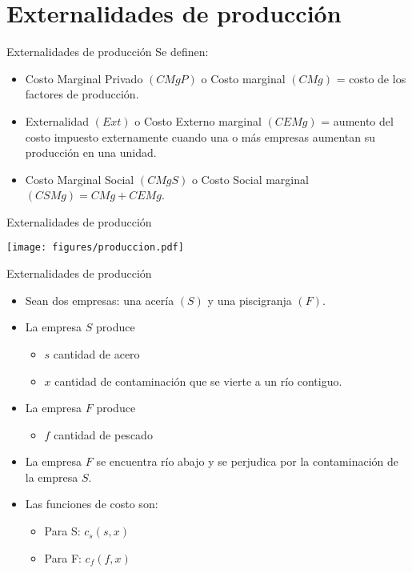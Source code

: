 \section[Producción]{Externalidades de producción}

\begin{frame}{Externalidades de producción}
Se definen:
	\begin{itemize}
		\item Costo Marginal Privado $(CMgP)$ o Costo marginal $(CMg)$ = costo de los factores de producción.
		\item Externalidad $(Ext)$ o Costo Externo marginal $(CEMg)$ = aumento del costo impuesto externamente cuando una o más empresas aumentan su producción en una unidad.
		\item Costo Marginal Social $(CMgS)$ o Costo Social marginal $(CSMg)= CMg + CEMg$.
	\end{itemize}
\end{frame}
\begin{frame}{Externalidades de producción}
		\begin{center}
		\texttt{[image: figures/produccion.pdf]}
	\end{center}
\end{frame}
\begin{frame}{Externalidades de producción}
	\begin{itemize}
		\item Sean dos empresas: una acería $(S)$ y una piscigranja $(F)$.
		\item La empresa $S$ produce
			\begin{itemize}
				\item $s$ cantidad de acero
				\item $x$ cantidad de contaminación que se vierte a un río contiguo.
			\end{itemize}
		\item La empresa $F$ produce
			\begin{itemize}
				\item $f$ cantidad de pescado
			\end{itemize}
		\item La empresa $F$ se encuentra río abajo y se perjudica por la contaminación de la empresa $S$.
		\item Las funciones de costo son:
			\begin{itemize}
				\item Para S: $c_s(s,x)$
				\item Para F: $c_f(f,x)$
			\end{itemize}
	\end{itemize}
\end{frame}
